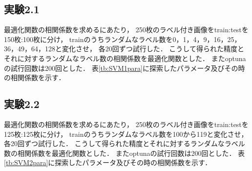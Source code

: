 \documentclass[twocolumn]{jarticle}     %
\begin{document}
\subsection{実験2.1}
最適化関数の相関係数を求めるにあたり，
250枚のラベル付き画像をtrain:testを150枚:100枚に分け，
trainのうちランダムなラベル数を0，1，4，9，16，25，36，49，64，128と変化させ，
各20回ずつ試行した．
こうして得られた精度とそれに対するランダムなラベル数の相関係数を最適化関数とした．
またoptunaの試行回数は200回とした．
表\ref{tb:SVM1para}に探索したパラメータ及びその時の相関係数を示す．

\begin{table}[h]
	\centering
	\caption{実験2.1のSVMのパラメータ\label{tb:SVM1para}}
\end{table}


\subsection{実験2.2}
最適化関数の相関係数を求めるにあたり，
250枚のラベル付き画像をtrain:testを125枚:125枚に分け，
trainのうちランダムなラベル数を100から119と変化させ，
各20回ずつ試行した．
こうして得られた精度とそれに対するランダムなラベル数の相関係数を最適化関数とした．
またoptunaの試行回数は200回とした．
表\ref{tb:SVM2para}に探索したパラメータ及びその時の相関係数を示す．

\begin{table}[h]
	\centering
	\caption{実験2.2のSVMのパラメータ\label{tb:SVM2para}}
\end{table}
\end{document}
